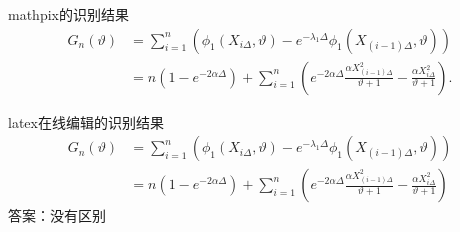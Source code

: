 \documentclass[fontset=windows]{article}
\begin{document}
mathpix的识别结果
$$
\begin{aligned}
G_{n}(\vartheta) &=\sum_{i=1}^{n}\left(\phi_{1}\left(X_{i \Delta}, \vartheta\right)-e^{-\lambda_{1} \Delta} \phi_{1}\left(X_{(i-1) \Delta}, \vartheta\right)\right) \\
&=n\left(1-e^{-2 \alpha \Delta}\right)+\sum_{i=1}^{n}\left(e^{-2 \alpha \Delta} \frac{\alpha X_{(i-1) \Delta}^{2}}{\vartheta+1}-\frac{\alpha X_{i \Delta}^{2}}{\vartheta+1}\right) .
\end{aligned}
$$

latex在线编辑的识别结果
$$
\begin{aligned}
    G_{n}(\vartheta) &=\sum_{i=1}^{n}\left(\phi_{1}\left(X_{i \Delta}, \vartheta\right)-e^{-\lambda_{1} \Delta} \phi_{1}\left(X_{(i-1) \Delta}, \vartheta\right)\right) \\
    &=n\left(1-e^{-2 \alpha \Delta}\right)+\sum_{i=1}^{n}\left(e^{-2 \alpha \Delta} \frac{\alpha X_{(i-1) \Delta}^{2}}{\vartheta+1}-\frac{\alpha X_{i \Delta}^{2}}{\vartheta+1}\right)
    \end{aligned}
$$
答案：没有区别
\end{document}
